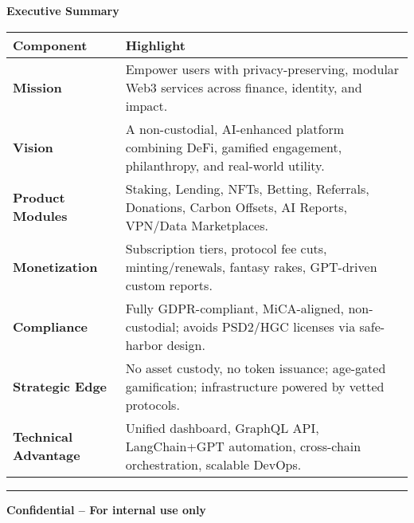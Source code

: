 \documentclass[13pt]{extarticle}
\begin{document}
\newpage
\thispagestyle{empty}
\begin{titlepage}
  \pagecolor{primary1!10}
  \centering
  \vspace*{2cm}

  {\Huge\bfseries Executive Summary\par}
  \vspace{1.2cm}

  \renewcommand{\arraystretch}{1.6}
  \begin{tabular}{>{\bfseries}p{4.8cm} p{9.2cm}}
    \toprule
    \textbf{Component} & \textbf{Highlight} \\
    \midrule
    Mission            & Empower users with privacy-preserving, modular Web3 services across finance, identity, and impact. \\
    Vision             & A non-custodial, AI-enhanced platform combining DeFi, gamified engagement, philanthropy, and real-world utility. \\
    Product Modules    & Staking, Lending, NFTs, Betting, Referrals, Donations, Carbon Offsets, AI Reports, VPN/Data Marketplaces. \\
    Monetization       & Subscription tiers, protocol fee cuts, minting/renewals, fantasy rakes, GPT-driven custom reports. \\
    Compliance         & Fully GDPR-compliant, MiCA-aligned, non-custodial; avoids PSD2/HGC licenses via safe-harbor design. \\
    Strategic Edge     & No asset custody, no token issuance; age-gated gamification; infrastructure powered by vetted protocols. \\
    Technical Advantage& Unified dashboard, GraphQL API, LangChain+GPT automation, cross-chain orchestration, scalable DevOps. \\
    \bottomrule
  \end{tabular}

  \vspace*{\fill}
  \vspace*{-1cm}
  {\centering\color{black}\rule{0.5\textwidth}{0.6pt}\par}
  \vspace{0.3cm}
  {\centering\small\textbf{Confidential – For internal use only}\par}
  \nopagecolor
\end{titlepage}


\newpage
\tableofcontents
\thispagestyle{plain}
\end{document}
